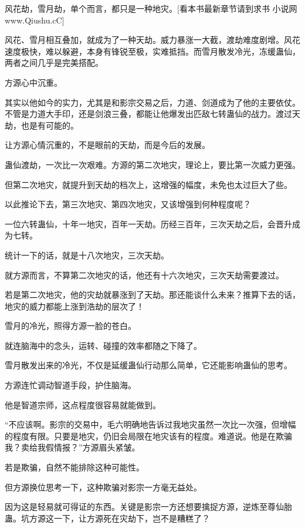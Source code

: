 
\begin{this_body}

风花劫，雪月劫，单个而言，都只是一种地灾。[看本书最新章节请到求书 小说网www.Qiushu.cC]

风花、雪月相互叠加，就成为了一种天劫。威力暴涨一大截，渡劫难度剧增。风花速度极快，难以躲避，本身有锋锐至极，实难抵挡。而雪月散发冷光，冻缓蛊仙，两者之间几乎是完美搭配。

方源心中沉重。

其实以他如今的实力，尤其是和影宗交易之后，力道、剑道成为了他的主要依仗。不管是力道大手印，还是剑浪三叠，都能让他爆发出匹敌七转蛊仙的战力。渡过天劫，也是有可能的。

让方源心情沉重的，不是眼前的天劫，而是今后的发展。

蛊仙渡劫，一次比一次艰难。方源的第二次地灾，理论上，要比第一次威力更强。

但第二次地灾，就提升到天劫的档次上，这增强的幅度，未免也太过巨大了些。

以此推论下去，第三次地灾、第四次地灾，又该增强到何种程度呢？

一位六转蛊仙，十年一地灾，百年一天劫。历经三百年，三次天劫之后，会晋升成为七转。

统计一下的话，就是十八次地灾，三次天劫。

就方源而言，不算第二次地灾的话，他还有十六次地灾，三次天劫需要渡过。

若是第二次地灾，他的灾劫就暴涨到了天劫。那还能谈什么未来？推算下去的话，地灾的威力都能上涨到浩劫的层次了！

雪月的冷光，照得方源一脸的苍白。

就连脑海中的念头，运转、碰撞的效率都随之下降了。

雪月散发出来的冷光，不仅是延缓蛊仙行动那么简单，它还能影响蛊仙的思考。

方源连忙调动智道手段，护住脑海。

他是智道宗师，这点程度很容易就能做到。

“不应该啊。影宗的交易中，毛六明确地告诉过我地灾虽然一次比一次强，但增幅的程度有限。只要是地灾，仍旧会局限在地灾该有的程度。难道说。他是在欺骗我？卖给我假情报？”方源眉头紧皱。

若是欺骗，自然不能排除这种可能性。

但方源换位思考一下，这种欺骗对影宗一方毫无益处。

因为这是轻易就可得证的东西。关键是影宗一方还想要擒捉方源，逆炼至尊仙胎蛊。坑方源这一下，让方源死在灾劫下，岂不是糟糕了？


\end{this_body}

